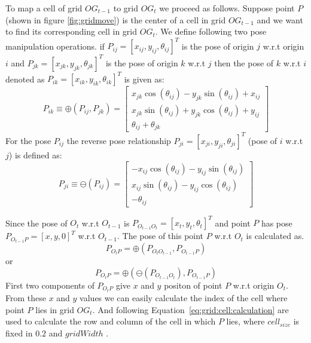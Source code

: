 To map a cell of grid $OG_{t-1}$ to grid $OG_t$ we proceed as follows. Suppose point $P$ (shown in figure \ref{fig:gridmove}) is the center of a cell in grid $OG_{t-1}$ and we want to find its corresponding cell in grid $OG_t$. We define following two pose manipulation operations. if $P_{ij}=[x_{ij}, y_{ij}, \theta_{ij}]^T$ is the pose of origin $j$ w.r.t origin $i$ and $P_{jk}=[x_{jk}, y_{jk}, \theta_{jk}]^T$ is the pose of origin $k$ w.r.t $j$ then the pose of $k$ w.r.t $i$ denoted as $P_{ik}=[x_{ik}, y_{ik}, \theta_{ik}]^T$ is given as:
\begin{equation}
P_{ik} \equiv \oplus (P_{ij}, P_{jk}) = \left[ \begin{array}{c}
x_{jk}\cos(\theta_{ij})-y_{jk}\sin(\theta_{ij})+x_{ij} \\
x_{jk}\sin(\theta_{ij})+y_{jk}\cos(\theta_{ij})+y_{ij} \\
\theta_{ij}+\theta_{jk} \end{array} \right] 
\end{equation}
For the pose $P_{ij}$ the reverse pose relationship $P_{ji}=[x_{ji}, y_{ji}, \theta_{ji}]^T$ (pose of $i$ w.r.t $j$) is defined as:
\begin{equation}
P_{ji} \equiv \ominus (P_{ij}) = \left[ \begin{array}{c}
-x_{ij}\cos(\theta_{ij})-y_{ij}\sin(\theta_{ij}) \\
x_{ij}\sin(\theta_{ij})-y_{ij}\cos(\theta_{ij}) \\
-\theta_{ij} \end{array} \right] 
\end{equation}

Since the pose of $O_t$ w.r.t $O_{t-1}$ is $P_{O_{t-1}O_t}=[x_t,y_t,\theta_t]^T$ and point $P$ has pose $P_{O_{t-1}P}=[x,y,0]^T$ w.r.t $O_{t-1}$. The pose of this point $P$ w.r.t $O_t$ is calculated as.
\begin{equation}
P_{O_tP} = \oplus (P_{O_tO_{t-1}}, P_{O_{t-1}P})
\end{equation}
or
\begin{equation}
P_{O_tP} = \oplus (\ominus(P_{O_{t-1}O_t}), P_{O_{t-1}P})
\end{equation}
First two components of $P_{O_tP}$ give $x$ and $y$ positon of point $P$ w.r.t origin $O_t$. From these $x$ and $y$ values we can easily calculate the index of the cell where point $P$ lies in grid $OG_t$. And following Equation~\ref{eq:grid:cell:calculation} are used to calculate the row and column of the cell in which $P$ lies, where $cell_{size}$ is fixed in $0.2$ and $gridWidth$ .

